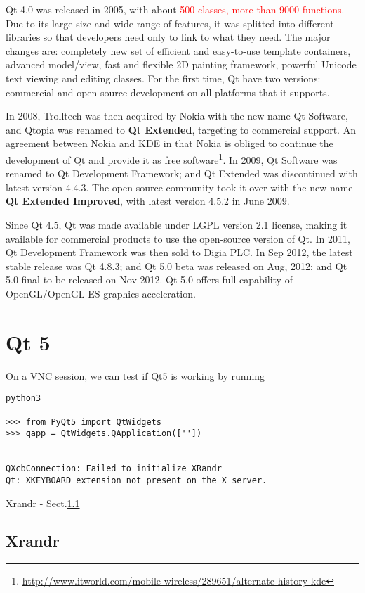 Qt 4.0 was released in 2005, with about \textcolor{red}{500 classes, more than
9000 functions}.
Due to its large size and wide-range of features, it was splitted into different
libraries so that developers need only to link to what they need. The major
changes are: completely new set of efficient and easy-to-use template
containers, advanced model/view, fast and flexible 2D painting framework,
powerful Unicode text viewing and editing classes. For the first time, Qt have
two versions: commercial and open-source development on all platforms that it
supports.

In 2008, Trolltech was then acquired by Nokia with the new name Qt Software, and
Qtopia was renamed to {\bf Qt Extended}, targeting to commercial support.  An
agreement between Nokia and KDE in that Nokia is obliged to continue the
development of Qt and provide it as free
software\footnote{\url{http://www.itworld.com/mobile-wireless/289651/alternate-history-kde}}.
In 2009, Qt Software was renamed to Qt Development Framework; and Qt Extended
was discontinued with latest version 4.4.3. The open-source community took it
over with the new name {\bf Qt Extended Improved}, with latest version 4.5.2 in
June 2009.

Since Qt 4.5, Qt was made available under LGPL version 2.1 license, making it
available for commercial products to use the open-source version of Qt. In 2011,
Qt Development Framework was then sold to Digia PLC.
In Sep 2012, the latest stable release was Qt 4.8.3; and Qt 5.0 beta was
released on Aug, 2012; and Qt 5.0 final to be released on Nov 2012. Qt 5.0
offers full capability of OpenGL/OpenGL ES graphics acceleration.


\section{Qt 5}

On a VNC session, we can test if Qt5 is working by running
\begin{verbatim}
python3

>>> from PyQt5 import QtWidgets
>>> qapp = QtWidgets.QApplication([''])


QXcbConnection: Failed to initialize XRandr
Qt: XKEYBOARD extension not present on the X server.
\end{verbatim}
Xrandr - Sect.\ref{sec:Xrandr}

\subsection{Xrandr}
\label{sec:Xrandr}

